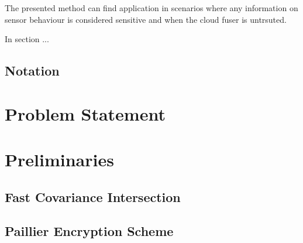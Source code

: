 \documentclass[letterpaper, 10 pt, conference]{ieeeconf}
\begin{document}
The presented method can find application in scenarios where any information on sensor behaviour is considered sensitive and when the cloud fuser is untrsuted.




In section ...




\subsection{Notation}


% 
%                                              
%                                              
%                                              
% 
\section{Problem Statement}\label{sec:problem}


% 
%                                                                 
%                                                                 
%                                                                 
% 
\section{Preliminaries}\label{sec:prelims}

\subsection{Fast Covariance Intersection}\label{subsec:fci}

\subsection{Paillier Encryption Scheme}\label{subsec:paillier}
\end{document}
